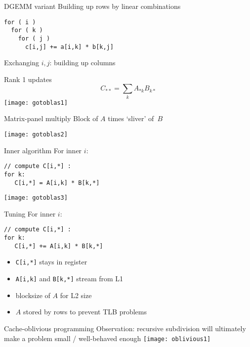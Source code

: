 \begin{frame}[fragile]{DGEMM variant}
Building up rows by linear combinations
\begin{verbatim}
for ( i )
  for ( k )
    for ( j )
      c[i,j] += a[i,k] * b[k,j]
\end{verbatim}
Exchanging $i,j$: building up columns
\end{frame}

\begin{frame}{Rank 1 updates}
  \[ C_{**} = \sum_k A_{*k}B_{k*} \]
  \texttt{[image: gotoblas1]}
\end{frame}

\begin{frame}{Matrix-panel multiply}
  Block of $A$ times `sliver' of~$B$

  \texttt{[image: gotoblas2]}  
\end{frame}

\begin{frame}[fragile]{Inner algorithm}
For inner $i$:
\begin{verbatim}
// compute C[i,*] :
for k:
   C[i,*] = A[i,k] * B[k,*]
\end{verbatim}
  \texttt{[image: gotoblas3]}
\end{frame}

\begin{frame}[fragile]{Tuning}
For inner $i$:
\begin{verbatim}
// compute C[i,*] :
for k:
   C[i,*] += A[i,k] * B[k,*]
\end{verbatim}
\begin{itemize}
\item \verb+C[i,*]+ stays in register
\item \verb+A[i,k]+ and \verb+B[k,*]+ stream from L1
\item blocksize of $A$ for L2 size
\item $A$ stored by rows to prevent TLB problems
\end{itemize}
\end{frame}

\begin{frame}{Cache-oblivious programming}
Observation: recursive subdivision will ultimately
make a problem small / well-behaved enough
  \texttt{[image: oblivious1]}
\end{frame}


